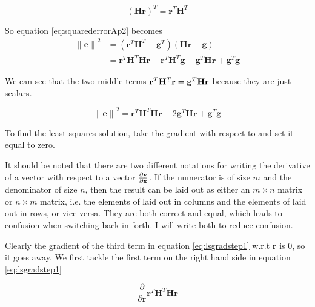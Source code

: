 \begin{equation}
	 ( \mathbf{Hr} )^{T} = \mathbf{r}^{T} \mathbf{H}^{T} 
\end{equation}

\noindent So equation \ref{eq:squarederrorAp2} becomes
\begin{equation}
	\begin{split}
		\mathbf{ \lVert \mathbf{e} \rVert }^2 & = ( \mathbf{r}^{T} \mathbf{H}^{T}  - \mathbf{g}^{T} )  ( \mathbf{Hr-g} ) \\
		& = \mathbf{r}^T \mathbf{H}^T \mathbf{H} \mathbf{r} - \mathbf{r}^T \mathbf{H}^T \mathbf{g} - \mathbf{g}^T \mathbf{H} \mathbf{r} + \mathbf{g}^T \mathbf{g}
	\end{split}
\end{equation}

\noindent We can see that the two middle terms $\mathbf{r}^T\mathbf{H}^T\mathbf{r} = \mathbf{g}^T\mathbf{Hr}$ because they are just scalars.

\begin{equation}\label{eq:lsgradstep1}
	\mathbf{ \lVert \mathbf{e} \rVert }^2 =  \mathbf{r}^{T} \mathbf{H}^{T} \mathbf{H} \mathbf{r} - 2 \mathbf{g}^{T} \mathbf{H} \mathbf{r} +   \mathbf{g}^T \mathbf{g}  
\end{equation}	

To find the least squares solution, take the gradient with respect to  and set it equal to zero. 

It should be noted that there are two different notations for writing the derivative of a vector with respect to a vector $\frac{ \partial{ \mathbf{y} } } { \partial{ \mathbf{x} } }$. If the numerator  is of size $m$ and the denominator  of size $n$, then the result can be laid out as either an $m \times n$ matrix or $n \times m$ matrix, i.e. the elements of  laid out in columns and the elements of  laid out in rows, or vice versa. They are both correct and equal, which leads to confusion when switching back in forth. I will write both to reduce confusion.

Clearly the gradient of the third term in equation \ref{eq:lsgradstep1} w.r.t $\mathbf{r}$ is $0$, so it goes away. We first tackle the first term on the right hand side in equation \ref{eq:lsgradstep1}

\begin{equation}
	\dfrac {\partial } {\partial \mathbf{r} }  \mathbf{r}^{T} \mathbf{H}^{T} \mathbf{H} \mathbf{r} 
\end{equation}

